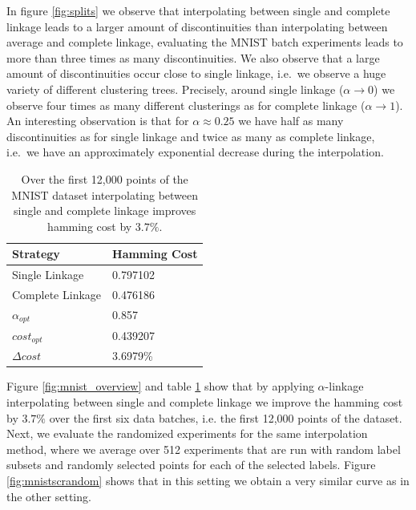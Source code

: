In figure \ref{fig:splits} we observe that interpolating between single and complete linkage leads to a larger amount of discontinuities than interpolating between average and complete linkage, evaluating the MNIST batch experiments leads to more than three times as many discontinuities. We also observe that a large amount of discontinuities occur close to single linkage, i.e.\ we observe a huge variety of different clustering trees. Precisely, around single linkage ($\alpha \rightarrow 0$) we observe four times as many different clusterings as for complete linkage ($\alpha \rightarrow 1$). An interesting observation is that for $\alpha \approx 0.25$ we have half as many discontinuities as for single linkage and twice as many as complete linkage, i.e.\ we have an approximately exponential decrease during the interpolation.

\begin{table}[H]
    \centering
    \begin{tabular}{|l | l |}
    \hline
    Strategy & Hamming Cost\\ \hline
    Single Linkage & 0.797102\\
    Complete Linkage & 0.476186\\
    $\alpha_{opt}$ & 0.857\\
    $cost_{opt}$ & 0.439207\\
    $\Delta cost$ & 3.6979\%\\\hline
    \end{tabular}
    \caption{Over the first 12,000 points of the MNIST dataset interpolating between single and complete linkage improves hamming cost by $3.7\%$.}
    \label{table:mnist1000avgsc}
\end{table}

Figure \ref{fig:mnist_overview} and table \ref{table:mnist1000avgsc} show that by applying $\alpha$-linkage interpolating between single and complete linkage we improve the hamming cost by $3.7\%$ over the first six data batches, i.e. the first 12,000 points of the dataset. Next, we evaluate the randomized experiments for the same interpolation method, where we average over 512 experiments that are run with random label subsets and randomly selected points for each of the selected labels. Figure \ref{fig:mnistscrandom} shows that in this setting we obtain a very similar curve as in the other setting.

